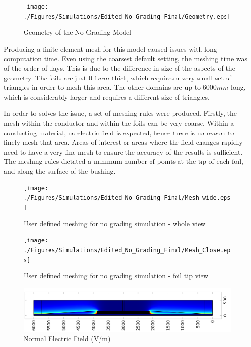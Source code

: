 \begin{figure}[!h]
  \centering
    \texttt{[image: ./Figures/Simulations/Edited\_No\_Grading\_Final/Geometry.eps]} 
	\caption{Geometry of the No Grading Model}
	\label{Figure:No_Grading_Geom}
\end{figure}

Producing a finite element mesh for this model caused issues with long computation time. 
Even using the coarsest default setting, the meshing time was of the order of days.
This is due to the difference in size of the aspects of the geometry.
The foils are just $0.1mm$ thick, which requires a very small set of triangles in order to mesh this area.
The other domains are up to $6000mm$ long, which is considerably larger and requires a different size of triangles.

In order to solves the issue, a set of meshing rules were produced.
Firstly, the mesh within the conductor and within the foils can be very coarse.
Within a conducting material, no electric field is expected, hence there is no reason to finely mesh that area.
Areas of interest or areas where the field changes rapidly need to have a very fine mesh to ensure the accuracy of the results is sufficient.
The meshing rules dictated a minimum number of points at the tip of each foil, and along the surface of the bushing.

\begin{figure}[!h]
  \centering
    \texttt{[image: ./Figures/Simulations/Edited\_No\_Grading\_Final/Mesh\_wide.eps]} 
	\caption{User defined meshing for no grading simulation - whole view}
\label{Figure:No_Grading_Mesh1}
\end{figure}

\begin{figure}[!h]
  \centering
    \texttt{[image: ./Figures/Simulations/Edited\_No\_Grading\_Final/Mesh\_Close.eps]} 
	\caption{User defined meshing for no grading simulation - foil tip view}
\label{Figure:No_Grading_Mesh2}
\end{figure}

\begin{figure}[!h]
  \centering
    \includegraphics[width = \textwidth]{./Figures/Simulations/Edited_No_Grading_Final/E_Field_Norm.png} 
	\caption{Normal Electric Field (V/m)}
\label{Figure:No_Grading_Field}
\end{figure}

